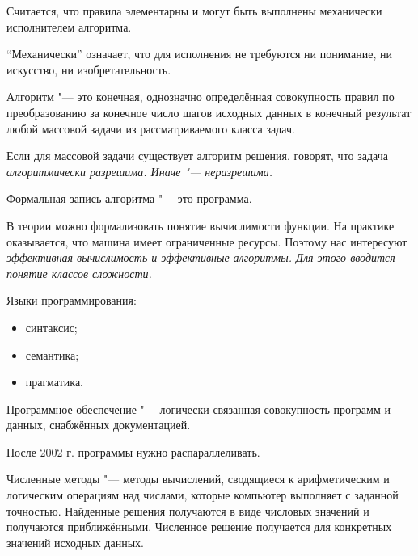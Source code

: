 Считается, что правила элементарны и могут быть выполнены механически исполнителем алгоритма.

``Механически'' означает, что для исполнения не требуются ни понимание, ни искусство, ни изобретательность.

\begin{definition}
	Алгоритм "--- это конечная, однозначно определённая совокупность правил по преобразованию за конечное число шагов исходных данных в конечный результат любой массовой задачи из рассматриваемого класса задач.
\end{definition}

Если для массовой задачи существует алгоритм решения, говорят, что задача \it{алгоритмически разрешима}.
Иначе "--- \it{неразрешима}.

Формальная запись алгоритма "--- это программа.

В теории можно формализовать понятие вычислимости функции. На практике оказывается, что машина имеет ограниченные ресурсы. Поэтому нас интересуют \it{эффективная вычислимость} и \it{эффективные алгоритмы}.
Для этого вводится понятие \it{классов сложности}.

Языки программирования:
\begin{itemize}
	\item синтаксис;
	\item семантика;
	\item прагматика.
\end{itemize}

\begin{definition}
	Программное обеспечение "--- логически связанная совокупность программ и данных, снабжённых документацией.
\end{definition}

После 2002 г. программы нужно распараллеливать.

\begin{definition}
	Численные методы "--- методы вычислений, сводящиеся к арифметическим и логическим операциям над числами, которые компьютер выполняет с заданной точностью. Найденные решения получаются в виде числовых значений и получаются приближёнными. Численное решение получается для конкретных значений исходных данных.
\end{definition}
